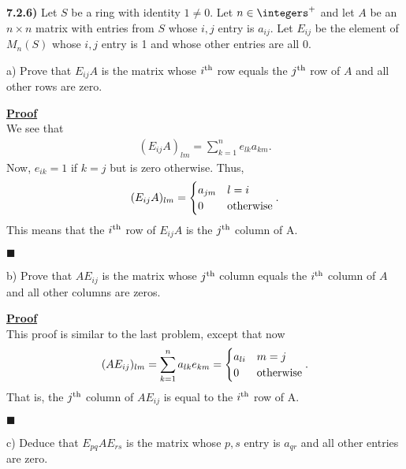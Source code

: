 \documentclass[12pt,a4paper]{article}
\newcommand{\prob}[2]{\textbf{#1)} #2}
\newenvironment{proof}
{
\textbf{\underline{Proof}} \\
}
{
\begin{flushright}
$\blacksquare$
\end{flushright}}
\begin{document}
\prob{7.2.6}{
Let $S$ be a ring with identity $1 \ne 0$. Let $n \in \integers^{+}$ and let $A$ be an $n \times n$ matrix with entries from $S$ whose $i,j$ entry is $a_{ij}$. Let $E_{ij}$ be the element of $M_{n}(S)$ whose $i,j$ entry is 1 and whose other entries are all 0.
}

a) Prove that $E_{ij}A$ is the matrix whose $i^{\rm th}$ row equals the $j^{\rm th}$ row of $A$ and all other rows are zero.

\begin{proof}
    We see that
    \begin{align*}
        (E_{ij}A)_{lm} = \sum_{k=1}^{n} e_{lk}a_{km}
    .\end{align*}
    Now, $e_{ik} = 1$ if $k = j$ but is zero otherwise.
    Thus, 
    \begin{align*}
        (E_{ij}A)_{lm} = \begin{cases}
            a_{jm} & l = i \\
            0 & {\rm otherwise}
        \end{cases}
    .\end{align*}
    This means that the $i^{\rm th}$ row of $E_{ij}A$ is the $j^{\rm th}$ column of A. 
\end{proof}

b) Prove that $AE_{ij}$ is the matrix whose $j^{\rm th}$ column equals the $i^{\rm th}$ column of $A$ and all other columns are zeros.

\begin{proof}
    This proof is similar to the last problem, except that now
    \begin{align*}
        (AE_{ij})_{lm} = \sum_{k=1}^{n} a_{lk}e_{km} = \begin{cases}
            a_{li} & m=j \\
            0 & {\rm otherwise}
        \end{cases}
    .\end{align*}
    That is, the $j^{\rm th}$ column of $AE_{ij}$ is equal to the $i^{\rm th}$ row of A.
\end{proof}

c) Deduce that $E_{pq}AE_{rs}$ is the matrix whose $p,s$ entry is $a_{qr}$ and all other entries are zero.
\end{document}
